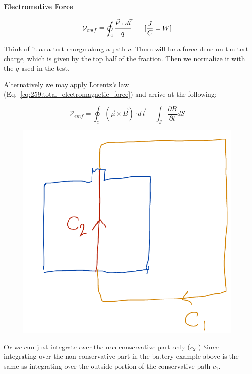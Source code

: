 \documentclass[10pt]{article}
\begin{document}
\begin{definition}
	\textbf{Electromotive Force} 


	\begin{equation}
	\mathcal{V}_{emf} \equiv \oint_c \cfrac{\vec{F} \cdot  d \vec{l}}{q} \qquad [\frac{J}{C} = W]
	\label{eq:259:emf}
	\end{equation}
		

	Think of it as a test charge along a path $ c $. 
	There will be a force done on the test charge, which is given by the top half of the fraction. Then we normalize it with the $ q $ used in the test.

	Alternatively we may apply Lorentz's law (Eq.~\ref{eq:259:total_electromagnetic_force}) and arrive at the following:

	\begin{equation}
		\mathcal{V}_{emf} = \oint_c (\vec{\mu} \times \vec{B} ) \cdot d \vec{l}  - \int_S \frac{\partial B}{\partial t}  dS
		\label{eq:259:emf_lorentz}
	\end{equation}


	
\end{definition}


\begin{figure}[H]
	\centering
	\includegraphics[width=0.8\linewidth]{img/image_2022-04-17-20-57-28.png}
\end{figure}

Or we can just integrate over the non-conservative part only ($ c_2 $ )
Since integrating over the non-conservative part in the battery example above is the same as integrating over the outside portion of the conservative path $ c_1 $.
\end{document}
